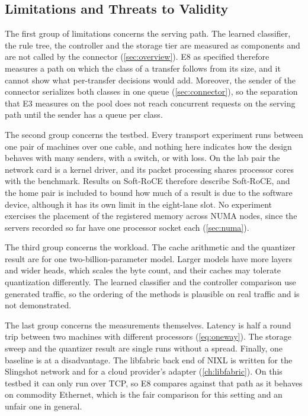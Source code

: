 \subsection{Limitations and Threats to Validity}

The first group of limitations concerns the serving path. The learned
classifier, the rule tree, the controller and the storage tier are measured
as components and are not called by the connector (\cref{sec:overview}). E8
as specified therefore measures a path on which the class of a transfer
follows from its size, and it cannot show what per-transfer decisions would
add. Moreover, the sender of the connector serializes both classes in one
queue (\cref{sec:connector}), so the separation that E3 measures on the pool
does not reach concurrent requests on the serving path until the sender has
 a queue per class.

The second group concerns the testbed. Every transport experiment runs
between one pair of machines over one cable, and nothing here indicates how
the design behaves with many senders, with a switch, or with loss. On the
lab pair the network card is a kernel driver, and its packet processing
shares processor cores with the benchmark. Results on Soft-RoCE therefore
describe Soft-RoCE, and the home pair is included to bound how much of a
result is due to the software device, although it has its own limit in the
eight-lane slot. No experiment exercises the placement of the registered
memory across NUMA nodes, since the servers recorded so far have one
processor socket each (\cref{sec:numa}).

The third group concerns the workload. The cache arithmetic and the
quantizer result are for one two-billion-parameter model. Larger models have
more layers and wider heads, which scales the byte count, and their caches
may tolerate quantization differently. The learned classifier and the
controller comparison use generated traffic, so the ordering of the methods
is plausible on real traffic and is not demonstrated.

The last group concerns the measurements themselves. Latency is half a round
trip between two machines with different processors (\cref{eq:oneway}). The
storage sweep and the quantizer result are single runs without a spread.
Finally, one baseline is at a disadvantage. The libfabric back end of NIXL
is written for the Slingshot network and for a cloud provider's adapter
(\cref{ch:libfabric}). On this testbed it can only run over TCP, so E8
compares against that path as it behaves on commodity Ethernet, which is the
fair comparison for this setting and an unfair one in general.

